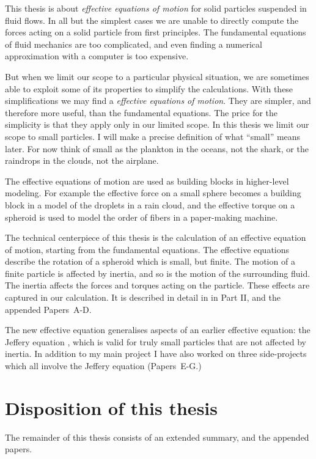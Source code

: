 \documentclass[thesis.tex]{subfiles}
\begin{document}
This thesis is about \emph{effective equations of motion} for solid particles suspended in fluid flows. In all but the simplest cases we are unable to directly compute the forces acting on a solid particle from first principles. The fundamental equations of fluid mechanics are too complicated, and even finding a numerical approximation with a computer is too expensive.

But when we limit our scope to a particular physical situation, we are sometimes able to exploit some of its properties to simplify the calculations. With these simplifications we may find a \emph{effective equations of motion}. They are simpler, and therefore more useful, than the fundamental equations. The price for the simplicity is that they apply only in our limited scope. In this thesis we limit our scope to small particles. I will make a precise definition of what ``small'' means later. For now think of small as the plankton in the oceans, not the shark, or the raindrops in the clouds, not the airplane.

The effective equations of motion are used as building blocks in higher-level modeling. For example the effective force on a small sphere becomes a building block in a model of the droplets in a rain cloud, and the effective torque on a spheroid is used to model the order of fibers in a paper-making machine.

The technical centerpiece of this thesis is the calculation of an effective equation of motion, starting from the fundamental equations. The effective equations describe the rotation of a spheroid which is small, but finite. The motion of a finite particle is affected by inertia, and so is the motion of the surrounding fluid. The inertia affects the forces and torques acting on the particle. These effects are captured in our calculation. It is described in detail in  in Part II, and the appended Papers~A-D.

The new effective equation generalises aspects of an earlier effective equation: the Jeffery equation \cite{jeffery1922}, which is valid for truly small particles that are not affected by inertia. In addition to my main project I have also worked on three side-projects which all involve the Jeffery equation (Papers~E-G.)

\section*{Disposition of this thesis}

The remainder of this thesis consists of an extended summary, and the appended papers.
\end{document}
